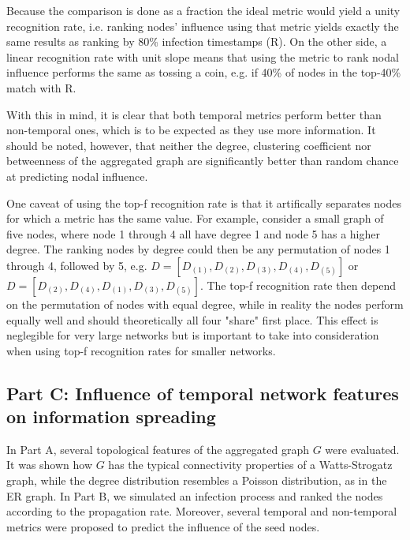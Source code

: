 \documentclass[letterpaper]{article}
\begin{document}
Because the comparison is done as a fraction the ideal metric would yield a unity recognition rate, i.e. ranking nodes' influence using that metric yields exactly the same results as ranking by 80\% infection timestamps (R). 
On the other side, a linear recognition rate with unit slope means that using the metric to rank nodal influence performs the same as tossing a coin, e.g. if 40\% of nodes in the top-40\% match with R.

With this in mind, it is clear that both temporal metrics perform better than non-temporal ones, which is to be expected as they use more information.
It should be noted, however, that neither the degree, clustering coefficient nor betweenness of the aggregated graph are significantly better than random chance at predicting nodal influence.

One caveat of using the top-f recognition rate is that it artifically separates nodes for which a metric has the same value. For example, consider a small graph of five nodes, where node 1 through 4 all have degree 1 and node 5 has a higher degree. The ranking nodes by degree could then be any permutation of nodes 1 through 4, followed by 5, e.g. \(D=[D_{(1)},D_{(2)},D_{(3)},D_{(4)},D_{(5)}]\) or \(D=[D_{(2)},D_{(4)},D_{(1)},D_{(3)},D_{(5)}]\). The top-f recognition rate then depend on the permutation of nodes with equal degree, while in reality the nodes perform equally well and should theoretically all four "share" first place. This effect is neglegible for very large networks but is important to take into consideration when using top-f recognition rates for smaller networks.


\subsection*{Part C: Influence of temporal network features on information spreading}
\label{sec:partC}

In Part A, several topological features of the aggregated graph \(G\) were evaluated. 
It was shown how \(G\) has the typical connectivity properties of a Watts-Strogatz graph, while the degree distribution resembles a Poisson distribution, as in the ER graph. 
In Part B, we simulated an infection process and ranked the nodes according to the propagation rate. Moreover, several temporal and non-temporal metrics were proposed to predict the influence of the seed nodes.
\end{document}
